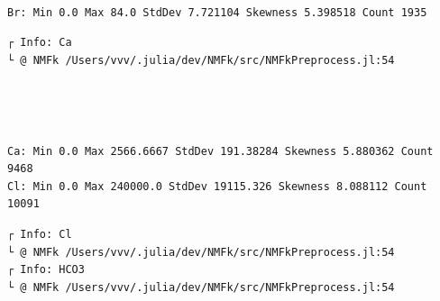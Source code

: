 \documentclass[11pt]{article}
\begin{document}
    \begin{center}
    \end{center}
    { \hspace*{\fill} \\}
    
    \begin{Verbatim}[commandchars=\\\{\}]
Br: Min 0.0 Max 84.0 StdDev 7.721104 Skewness 5.398518 Count 1935
    \end{Verbatim}

    \begin{Verbatim}[commandchars=\\\{\}]
┌ Info: Ca
└ @ NMFk /Users/vvv/.julia/dev/NMFk/src/NMFkPreprocess.jl:54
    \end{Verbatim}

    \begin{center}
    \end{center}
    { \hspace*{\fill} \\}
    
    \begin{center}
    \end{center}
    { \hspace*{\fill} \\}
    
    \begin{Verbatim}[commandchars=\\\{\}]
Ca: Min 0.0 Max 2566.6667 StdDev 191.38284 Skewness 5.880362 Count 9468
Cl: Min 0.0 Max 240000.0 StdDev 19115.326 Skewness 8.088112 Count 10091
    \end{Verbatim}

    \begin{Verbatim}[commandchars=\\\{\}]
┌ Info: Cl
└ @ NMFk /Users/vvv/.julia/dev/NMFk/src/NMFkPreprocess.jl:54
┌ Info: HCO3
└ @ NMFk /Users/vvv/.julia/dev/NMFk/src/NMFkPreprocess.jl:54
    \end{Verbatim}

    \begin{center}
    \end{center}
    { \hspace*{\fill} \\}
    
\end{document}
